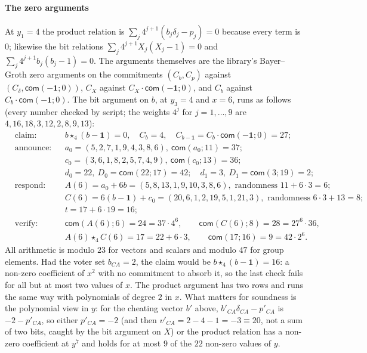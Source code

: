 \documentclass[11pt,a4paper]{article}
\newcommand{\com}{\mathsf{com}}
\theoremstyle{remark}
\begin{document}
\paragraph{The zero arguments} At $y_1 = 4$ the product relation is
$\sum_{j} 4^{j+1} (b_j \delta_j - p_j) = 0$ because every term is $0$;
likewise the bit relations $\sum_j 4^{j+1} X_j (X_j - 1) = 0$ and $\sum_j
4^{j+1} b_j (b_j - 1) = 0$. The arguments themselves are the library's
Bayer--Groth zero arguments on the commitments $(C_b, C_p)$ against
$(C_\delta, \com(-\mathbf{1}; 0))$, $C_X$ against $C_X \cdot
\com(-\mathbf{1}; 0)$, and $C_b$ against $C_b \cdot \com(-\mathbf{1};
0)$. The bit argument on $b$, at $y_3 = 4$ and $x = 6$, runs as follows
(every number checked by script; the weights $4^j$ for $j = 1, \ldots, 9$
are $4, 16, 18, 3, 12, 2, 8, 9, 13$):
\begin{align*}
  &\text{claim:} && b \star_4 (b - \mathbf{1}) = 0, \quad C_b = 4, \quad
     C_{b - \mathbf{1}} = C_b \cdot \com(-\mathbf{1}; 0) = 27;\\
  &\text{announce:} && a_0 = (5,2,7,1,9,4,3,8,6),\ \com(a_0; 11) = 37;\\
  & && c_0 = (3,6,1,8,2,5,7,4,9),\ \com(c_0; 13) = 36;\\
  & && d_0 = 22,\ D_0 = \com(22; 17) = 42; \quad d_1 = 3,\ D_1 = \com(3; 19) = 2;\\
  &\text{respond:} && A(6) = a_0 + 6b = (5,8,13,1,9,10,3,8,6), \text{ randomness } 11 + 6 \cdot 3 = 6;\\
  & && C(6) = 6(b - \mathbf{1}) + c_0 = (20,6,1,2,19,5,1,21,3), \text{ randomness } 6 \cdot 3 + 13 = 8;\\
  & && t = 17 + 6 \cdot 19 = 16;\\
  &\text{verify:} && \com(A(6); 6) = 24 = 37 \cdot 4^6, \qquad
     \com(C(6); 8) = 28 = 27^6 \cdot 36,\\
  & && A(6) \star_4 C(6) = 17 = 22 + 6 \cdot 3, \qquad \com(17; 16) = 9 = 42 \cdot 2^6 .
\end{align*}
All arithmetic is modulo $23$ for vectors and scalars and modulo $47$ for
group elements. Had the voter set $b_{CA} = 2$, the claim would be $b
\star_4 (b - \mathbf{1}) = 16$: a non-zero coefficient of $x^2$ with no
commitment to absorb it, so the last check fails for all but at most two
values of $x$. The product argument has two rows and runs the same way
with polynomials of degree $2$ in $x$. What matters for soundness is the
polynomial view in $y$: for the cheating
vector $b'$ above, $b'_{CA} \delta_{CA} - p'_{CA}$ is $-2 - p'_{CA}$, so
either $p'_{CA} = -2$ (and then $v'_{CA} = 2 - 4 - 1 = -3 \equiv 20$, not
a sum of two bits, caught by the bit argument on $X$) or the product
relation has a non-zero coefficient at $y^{7}$ and holds for at most $9$
of the $22$ non-zero values of $y$.
\end{document}
